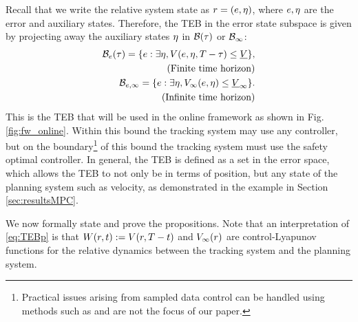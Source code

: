 Recall that we write the relative system state as $r = (e, \eta)$, where $e,\eta$ are the error and auxiliary states.
Therefore, the TEB in the error state subspace is given by projecting away the auxiliary states $\eta$ in $\mathcal B(\tau)$ or $\mathcal B_\infty$:
\begin{subequations} \label{eq:TEBp}
  \begin{align} 
  \TEB_\estate(\tau) = \{\estate: \exists \astate, \valfunc(\estate, \astate, \thor-\tau) \le \underline\valfunc\},\label{eq:TEBp:inf} \\
  \quad \text{(Finite time horizon)} \nonumber\\
  \TEB_{\estate, \infty} = \{\estate: \exists \astate, \valfunc_\infty(\estate, \astate) \le \underline\valfunc_\infty\}. \label{eq:TEBp:fin} \\
  \quad \text{(Infinite time horizon)} \nonumber
  \end{align}
\end{subequations}
This is the TEB that will be used in the online framework as shown in Fig. \ref{fig:fw_online}. 
Within this bound the tracking system may use any controller, but on the boundary\footnote{Practical issues arising from sampled data control can be handled using methods such as \cite{Mitchell2012, Mitchell13, Dabadie2014} and are not the focus of our paper.} of this bound the tracking system must use the safety optimal controller.
In general, the TEB is defined as a set in the error space, which allows the TEB to not only be in terms of position, but any state of the planning system such as velocity, as demonstrated in the example in Section \ref{sec:resultsMPC}.

We now formally state and prove the propositions. 
Note that an interpretation of \eqref{eq:TEBp} is that $W(r, t) := V(r, T - t)$ and $V_\infty(r)$ are control-Lyapunov functions for the relative dynamics between the tracking system and the planning system.

